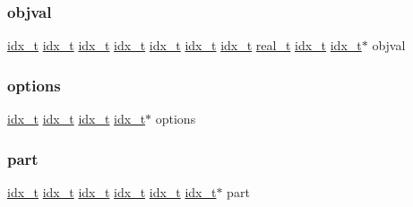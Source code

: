 \subsubsection{\texorpdfstring{objval}{objval}}
{\footnotesize\ttfamily \hyperlink{a00876_aaa5262be3e700770163401acb0150f52}{idx\+\_\+t} \hyperlink{a00876_aaa5262be3e700770163401acb0150f52}{idx\+\_\+t} \hyperlink{a00876_aaa5262be3e700770163401acb0150f52}{idx\+\_\+t} \hyperlink{a00876_aaa5262be3e700770163401acb0150f52}{idx\+\_\+t} \hyperlink{a00876_aaa5262be3e700770163401acb0150f52}{idx\+\_\+t} \hyperlink{a00876_aaa5262be3e700770163401acb0150f52}{idx\+\_\+t} \hyperlink{a00876_aaa5262be3e700770163401acb0150f52}{idx\+\_\+t} \hyperlink{a00876_a1924a4f6907cc3833213aba1f07fcbe9}{real\+\_\+t} \hyperlink{a00876_aaa5262be3e700770163401acb0150f52}{idx\+\_\+t} \hyperlink{a00876_aaa5262be3e700770163401acb0150f52}{idx\+\_\+t}$\ast$ objval}

\mbox{\label{a00879_a68c032ed4161802775c6847d4cb39adf}} 
\subsubsection{\texorpdfstring{options}{options}}
{\footnotesize\ttfamily \hyperlink{a00876_aaa5262be3e700770163401acb0150f52}{idx\+\_\+t} \hyperlink{a00876_aaa5262be3e700770163401acb0150f52}{idx\+\_\+t} \hyperlink{a00876_aaa5262be3e700770163401acb0150f52}{idx\+\_\+t} \hyperlink{a00876_aaa5262be3e700770163401acb0150f52}{idx\+\_\+t}$\ast$ options}

\mbox{\label{a00879_a0a9ea8670f88d6db1e021fee2dcd94be}} 
\subsubsection{\texorpdfstring{part}{part}}
{\footnotesize\ttfamily \hyperlink{a00876_aaa5262be3e700770163401acb0150f52}{idx\+\_\+t} \hyperlink{a00876_aaa5262be3e700770163401acb0150f52}{idx\+\_\+t} \hyperlink{a00876_aaa5262be3e700770163401acb0150f52}{idx\+\_\+t} \hyperlink{a00876_aaa5262be3e700770163401acb0150f52}{idx\+\_\+t} \hyperlink{a00876_aaa5262be3e700770163401acb0150f52}{idx\+\_\+t} \hyperlink{a00876_aaa5262be3e700770163401acb0150f52}{idx\+\_\+t}$\ast$ part}

